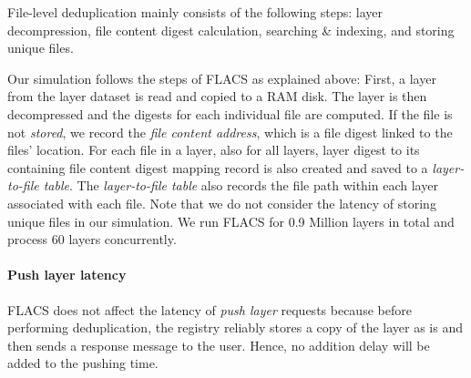 File-level deduplication mainly
consists of the following steps: 
layer decompression, 
file content digest calculation,
searching \& indexing,
and storing unique files.
% 

Our simulation follows the steps of FLACS as explained above:
First, a layer from the layer dataset is read and copied
to a RAM disk. The layer is then decompressed and 
the digests for each individual file are computed.
%
If the file is not \emph{stored},
we record the \textit{file content address}, which is a
file digest linked to the files' location.
%
For each file in a layer, 
also for all layers, layer digest
to its containing file content digest mapping record is also created and saved
to a \textit{layer-to-file table}.
%
The \textit{layer-to-file table} also
records the file path within each layer associated with each file.
%
Note that we do not consider the latency of storing unique files in our simulation.
%
%
We run FLACS for 0.9 Million layers in total and process 60 layers concurrently.
%
%
%
%

\paragraph{Push layer latency}

FLACS does not affect the latency of \emph{push layer} requests
because before performing deduplication, the registry reliably stores
a copy of the layer as is and then sends a response message to the user.
%
Hence, no addition delay will be added to the pushing time. 
%
